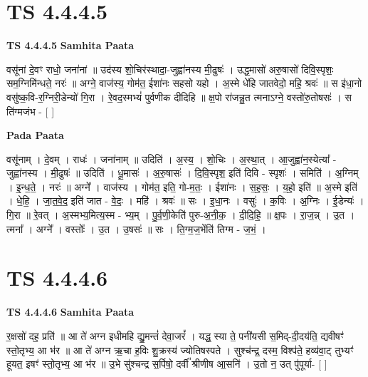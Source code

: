 \documentclass[17pt]{extarticle}
\begin{document}

\section{ TS 4.4.4.5 }

\textbf{TS 4.4.4.5 } \newline
\textbf{Samhita Paata} \newline

वसू॑नां दे॒वꣳ राधो॒ जना॑नां ॥ उद॑स्य शो॒चिर॑स्थादा॒-जुह्वा॑नस्य मी॒ढुषः॑ । उद्ध॒मासो॑ अरु॒षासो॑ दिवि॒स्पृशः॒ सम॒ग्निमि॑न्धते॒ नरः॑ ॥ अग्ने॒ वाज॑स्य॒ गोम॑त॒ ईशा॑नः सहसो यहो । अ॒स्मे धे॑हि जातवेदो॒ महि॒ श्रवः॑ ॥ स इ॑धा॒नो वसु॑ष्क॒वि-र॒ग्निरी॒डेन्यो॑ गि॒रा । रे॒वद॒स्मभ्यं॑ पुर्वणीक दीदिहि ॥ क्ष॒पो रा॑जन्नु॒त त्मनाऽग्ने॒ वस्तो॑रु॒तोषसः॑ । स ति॑ग्मजंभ - [  ] \newline

\textbf{Pada Paata} \newline

वसू॑नाम् । दे॒वम् । राधः॑ । जना॑नाम् ॥ उदिति॑ । अ॒स्य॒ । शो॒चिः । अ॒स्था॒त् । आ॒जुह्वा॑न॒स्येत्या᳚ - जुह्वा॑नस्य । मी॒ढुषः॑ ॥ उदिति॑ । धू॒मासः॑ । अ॒रु॒षासः॑ । दि॒वि॒स्पृश॒ इति॑ दिवि - स्पृशः॑ । समिति॑ । अ॒ग्निम् । इ॒न्ध॒ते॒ । नरः॑ ॥ अग्ने᳚ । वाज॑स्य । गोम॑त॒ इति॒ गो-म॒तः॒ । ईशा॑नः । स॒ह॒सः॒ । य॒हो॒ इति॑ ॥ अ॒स्मे इति॑ । धे॒हि॒ । जा॒त॒वे॒द॒ इति॑ जात - वे॒दः॒ । महि॑ । श्रवः॑ ॥ सः । इ॒धा॒नः । वसुः॑ । क॒विः । अ॒ग्निः । ई॒डेन्यः॑ । गि॒रा ॥ रे॒वत् । अ॒स्मभ्य॒मित्य॒स्म - भ्य॒म् । पु॒र्व॒णी॒केति॑ पुरु-अ॒नी॒क॒ । दी॒दि॒हि॒ ॥ क्ष॒पः । रा॒ज॒न्न् । उ॒त । त्मना᳚ । अग्ने᳚ । वस्तोः᳚ । उ॒त । उ॒षसः॑ ॥ सः । ति॒ग्म॒ज॒भेंति॑ तिग्म - ज॒भं॒ ।  \newline





\section{ TS 4.4.4.6 }

\textbf{TS 4.4.4.6 } \newline
\textbf{Samhita Paata} \newline

र॒क्षसो॑ दह॒ प्रति॑ ॥ आ ते॑ अग्न इधीमहि द्यु॒मन्तं॑ देवा॒जरं᳚ । यद्ध॒ स्या ते॒ पनी॑यसी स॒मिद्-दी॒दय॑ति॒ द्यवीषꣳ॑ स्तो॒तृभ्य॒ आ भ॑र ॥ आ ते॑ अग्न ऋ॒चा ह॒विः शु॒क्रस्य॑ ज्योतिषस्पते । सुश्च॑न्द्र॒ दस्म॒ विश्प॑ते॒ हव्य॑वा॒ट् तुभ्यꣳ॑ हूयत॒ इषꣳ॑ स्तो॒तृभ्य॒ आ भ॑र ॥ उ॒भे सु॑श्चन्द्र स॒र्पिषो॒ दर्वी᳚ श्रीणीष आ॒सनि॑ । उ॒तो न॒ उत् पु॑पूर्या- [  ] \newline
\end{document}
